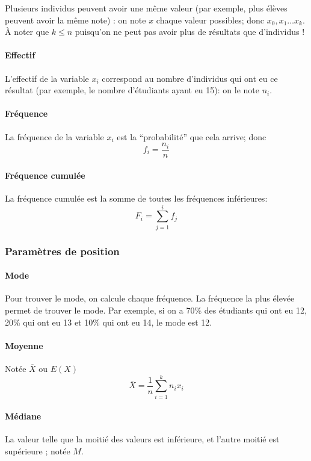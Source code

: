 \documentclass[10pt,a4paper,french]{article}
\begin{document}
Plusieurs individus peuvent avoir une même valeur (par exemple, plus élèves peuvent avoir la même note) : on note $x$ chaque valeur possibles; donc $x_0, x_1 \ldots x_k$. À noter que $k \leq n$ puisqu'on ne peut pas avoir plus de résultats que d'individus !

\paragraph{Effectif}
L'effectif de la variable $x_i$ correspond au nombre d'individus qui ont eu ce résultat (par exemple, le nombre d'étudiants ayant eu 15): on le note $n_i$.

\paragraph{Fréquence}
La fréquence de la variable $x_i$ est la ``probabilité'' que cela arrive; donc \[ f_i = \frac{n_i}{n} \]

\paragraph{Fréquence cumulée}
La fréquence cumulée est la somme de toutes les fréquences inférieures: \[ F_i = \sum_{j=1}^i f_j \]

\subsubsection{Paramètres de position}

\paragraph{Mode}
Pour trouver le mode, on calcule chaque fréquence. La fréquence la plus élevée permet de trouver le mode. Par exemple, si on a 70\% des étudiants qui ont eu 12, 20\% qui ont eu 13 et 10\% qui ont eu 14, le mode est 12.

\paragraph{Moyenne}
Notée $\overline{X}$ ou $E(X)$ \[ \overline{X} = \frac{1}{n} \sum_{i=1}^k n_i x_i \]

\paragraph{Médiane}
La valeur telle que la moitié des valeurs est inférieure, et l'autre moitié est supérieure ; notée $M$.
\end{document}
